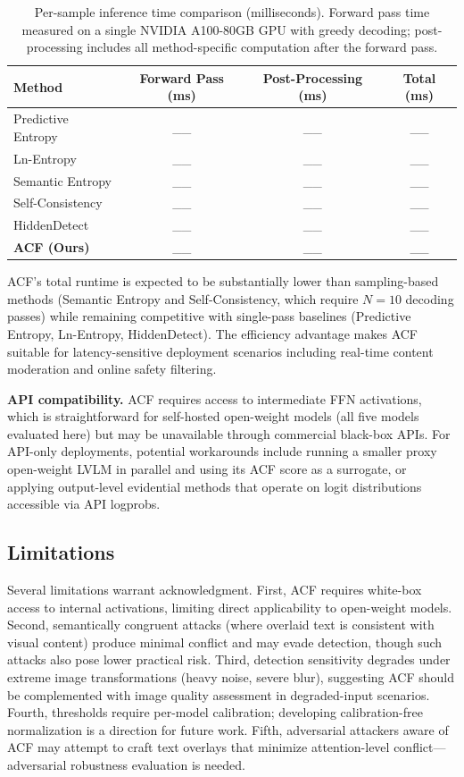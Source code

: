\documentclass[preprint,12pt]{elsarticle}
\begin{document}
\begin{table}[t]
\centering
\caption{Per-sample inference time comparison (milliseconds). Forward pass time measured on a single NVIDIA A100-80GB GPU with greedy decoding; post-processing includes all method-specific computation after the forward pass.}
\label{tab:runtime}
\begin{tabular}{lccc}
\toprule
Method & Forward Pass (ms) & Post-Processing (ms) & Total (ms) \\
\midrule
Predictive Entropy    & \_\_ & \_\_ & \_\_ \\
Ln-Entropy            & \_\_ & \_\_ & \_\_ \\
Semantic Entropy      & \_\_ & \_\_ & \_\_ \\
Self-Consistency      & \_\_ & \_\_ & \_\_ \\
HiddenDetect          & \_\_ & \_\_ & \_\_ \\
\textbf{ACF (Ours)}   & \_\_ & \_\_ & \_\_ \\
\bottomrule
\end{tabular}
\end{table}

ACF's total runtime is expected to be substantially lower than sampling-based methods (Semantic Entropy and Self-Consistency, which require $N=10$ decoding passes) while remaining competitive with single-pass baselines (Predictive Entropy, Ln-Entropy, HiddenDetect). The efficiency advantage makes ACF suitable for latency-sensitive deployment scenarios including real-time content moderation and online safety filtering.

\textbf{API compatibility.} ACF requires access to intermediate FFN activations, which is straightforward for self-hosted open-weight models (all five models evaluated here) but may be unavailable through commercial black-box APIs. For API-only deployments, potential workarounds include running a smaller proxy open-weight LVLM in parallel and using its ACF score as a surrogate, or applying output-level evidential methods that operate on logit distributions accessible via API logprobs.

\subsection{Limitations}

Several limitations warrant acknowledgment. First, ACF requires white-box access to internal activations, limiting direct applicability to open-weight models. Second, semantically congruent attacks (where overlaid text is consistent with visual content) produce minimal conflict and may evade detection, though such attacks also pose lower practical risk. Third, detection sensitivity degrades under extreme image transformations (heavy noise, severe blur), suggesting ACF should be complemented with image quality assessment in degraded-input scenarios. Fourth, thresholds require per-model calibration; developing calibration-free normalization is a direction for future work. Fifth, adversarial attackers aware of ACF may attempt to craft text overlays that minimize attention-level conflict---adversarial robustness evaluation is needed.
\end{document}
